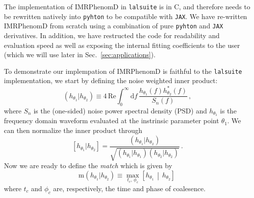 \documentclass[twocolumn]{aastex631}
\newcommand{\jax}{\texttt{JAX}\xspace}
\newcommand{\lalsuite}{\texttt{lalsuite}\xspace}
\begin{document}
The implementation of IMRPhenomD in \lalsuite is in C, and therefore needs to be rewritten natively into \texttt{pyhton} to be compatible with \jax.
We have re-written IMRPhenomD from scratch using a combination of pure \texttt{pyhton} and \jax derivatives.
In addition, we have restructed the code for readability and evaluation speed as well as exposing the internal fitting coefficients to the user (which we will use later in Sec.~\ref{sec:applications}).

To demonstrate our implempation of IMRPhenomD is faithful to the \lalsuite implementation, we start by defining the noise weighted inner product:
\begin{equation}
    \left(h_{\theta_1}|h_{\theta_2}\right) \equiv 4 \, \mathrm{Re} \int^{\infty}_{0} \mathrm{d} f \, \frac{ h_{\theta_1}(f) h^*_{\theta_2}(f)}{S_n(f)}\, ,
\end{equation}
where $S_n$ is the (one-sided) noise power spectral density (PSD) and $h_{\theta_1}$ is the frequency domain waveform evaluated at the instrinsic parameter point $\theta_1$.
We can then normalize the inner product through
\begin{equation}
    \left[h_{\theta_1}|h_{\theta_2}\right] = \frac{\left(h_{\theta_1}|h_{\theta_2}\right)}{\sqrt{\left(h_{\theta_1}|h_{\theta_1}\right)\left(h_{\theta_2}|h_{\theta_2}\right)}}\, .
\end{equation}
Now we are ready to define the \textit{match} which is given by 
\begin{equation}
    \mathrm{m}(h_{\theta_1}|h_{\theta_2}) \equiv \max_{t_c,\, \phi_c} \left[h_{\theta_1} \, \middle| \, h_{\theta_2} \right]\,
\end{equation}
where $t_c$ and $\phi_c$ are, respectively, the time and phase of coalesence.
\end{document}
